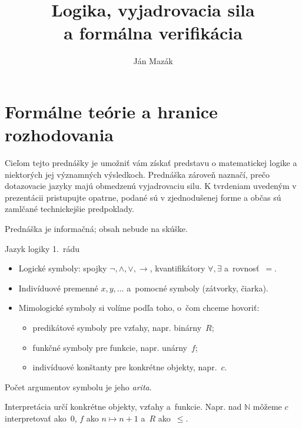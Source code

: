 \documentclass[12pt]{beamer}
\title{Logika, vyjadrovacia sila\\a formálna verifikácia}
\author{Ján Mazák}
\institute{FMFI UK Bratislava}
\date{}
\newcommand{\limpl}{\rightarrow}
\begin{document}
\frame{\titlepage}

\section{Formálne teórie a hranice rozhodovania}

\begin{frame}
  Cieľom tejto prednášky je umožniť vám získať predstavu o matematickej logike
  a niektorých jej významných výsledkoch.
  Prednáška zároveň naznačí, prečo dotazovacie jazyky majú obmedzenú vyjadrovaciu silu.
  K tvrdeniam uvedeným v prezentácii pristupujte opatrne,
  podané sú v zjednodušenej forme a občas sú zamlčané technickejšie predpoklady.

  \bigskip

  Prednáška je informačná; obsah nebude na skúške.
\end{frame}

\begin{frame}{Jazyk logiky 1.~rádu}
  \begin{itemize}
    \item \alert{Logické symboly}: spojky $\lnot,\land,\lor,\limpl$,
      kvantifikátory $\forall,\exists$ a~rovnosť~$=$.
    \item Indivíduové premenné $x,y,\ldots$ a~pomocné symboly (zátvorky, čiarka).
    \item \alert{Mimologické symboly} si volíme podľa toho, o~čom chceme hovoriť:
      \begin{itemize}
        \item predikátové symboly pre vzťahy, napr. binárny~$R$;
        \item funkčné symboly pre funkcie, napr. unárny~$f$;
        \item indivíduové konštanty pre konkrétne objekty, napr.~$c$.
      \end{itemize}
  \end{itemize}
  Počet argumentov symbolu je jeho \emph{arita}.

  \medskip
  Interpretácia určí konkrétne objekty, vzťahy a~funkcie.
  Napr. nad $\mathbb N$ môžeme $c$ interpretovať ako~$0$,
  $f$ ako $n\mapsto n+1$ a~$R$ ako~$\le$.
\end{frame}
\end{document}
